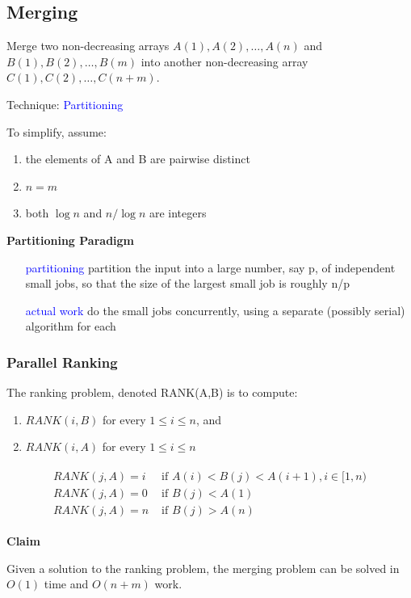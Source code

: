 \documentclass{article}
\begin{document}
\subsection{Merging}
Merge two non-decreasing arrays $A(1), A(2), \dots, A(n)$ and $B(1), B(2), \dots, B(m)$ into another non-decreasing array $C(1), C(2), \dots, C(n+m)$. 

Technique: \textcolor{blue}{Partitioning}

To simplify, assume:
\begin{enumerate}
    \item  the elements of A and B are pairwise distinct
    \item $n = m$
    \item both $\log n$ and $n/\log n$ are integers
\end{enumerate}

\textbf{Partitioning Paradigm}

\begin{itemize}
    \item [\textcolor{blue}{partitioning}] partition the input into a large number, say p, of independent small jobs, so that the size of the largest small job is roughly n/p
    \item [\textcolor{blue}{actual work}] do the small jobs concurrently, using a separate (possibly serial) algorithm for each
\end{itemize}

\subsubsection{Parallel Ranking}
The ranking problem, denoted RANK(A,B) is to compute: 
\begin{enumerate}
    \item $RANK( i, B)$ for every $1 \le i \le n$, and
    \item $RANK( i, A)$ for every $1 \le i \le n$
\end{enumerate}
\begin{align*}
    \begin{array}{ll}
        RANK( j, A) = i& \text{ if }A(i) < B(j) < A(i + 1), i\in [1, n)\\
        RANK( j, A) = 0& \text{ if }B(j) < A(1)\\ 
        RANK( j, A) = n& \text{ if }B(j) > A(n)
    \end{array}
\end{align*}

\textbf{Claim}\par
Given a solution to the ranking problem, the merging problem can be solved in $O(1)$ time and $O(n+m)$ work.
\end{document}
